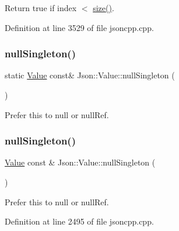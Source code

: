 Return true if index $<$ \hyperlink{class_json_1_1_value_a0ec2808e1d7efa4e9fad938d6667be44}{size()}. 



Definition at line 3529 of file jsoncpp.\+cpp.

\hypertarget{class_json_1_1_value_a48ce2d77935d7f280ba3e9899217a370}{}\label{class_json_1_1_value_a48ce2d77935d7f280ba3e9899217a370} 
\subsubsection{\texorpdfstring{null\+Singleton()}{nullSingleton()}\hspace{0.1cm}{\footnotesize\ttfamily [1/2]}}
{\footnotesize\ttfamily static \hyperlink{class_json_1_1_value}{Value} const\& Json\+::\+Value\+::null\+Singleton (\begin{DoxyParamCaption}{ }\end{DoxyParamCaption})\hspace{0.3cm}{\ttfamily [static]}}



Prefer this to null or null\+Ref. 

\hypertarget{class_json_1_1_value_af2f124567acc35d021a424e53ebdfcab}{}\label{class_json_1_1_value_af2f124567acc35d021a424e53ebdfcab} 
\subsubsection{\texorpdfstring{null\+Singleton()}{nullSingleton()}\hspace{0.1cm}{\footnotesize\ttfamily [2/2]}}
{\footnotesize\ttfamily \hyperlink{class_json_1_1_value}{Value} const  \& Json\+::\+Value\+::null\+Singleton (\begin{DoxyParamCaption}{ }\end{DoxyParamCaption})\hspace{0.3cm}{\ttfamily [static]}}



Prefer this to null or null\+Ref. 



Definition at line 2495 of file jsoncpp.\+cpp.

\hypertarget{class_json_1_1_value_a731b89fb4764c39ce2328e1707c822b9}{}\label{class_json_1_1_value_a731b89fb4764c39ce2328e1707c822b9} 
